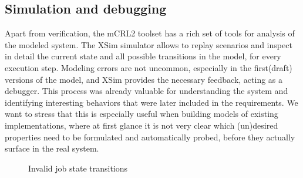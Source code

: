 \documentclass[sort&compress,preprint,3p]{elsarticle}
\begin{document}
\subsection{Simulation and debugging}
Apart from verification, the mCRL2 toolset has a rich set of tools for analysis of the modeled system. 
The XSim simulator allows to replay scenarios and inspect in 
detail the current state and all possible transitions in the model, for every execution step. 
Modeling errors are not uncommon, especially in the first(draft) versions of the
model, and XSim provides the necessary feedback, acting as a debugger.
This process was already valuable for understanding the
system and identifying interesting behaviors that were later included
in the requirements. We want to stress that this is especially useful
when building models of existing implementations, where at first glance it 
is not very clear which (un)desired properties need to be formulated and automatically probed,
before they actually surface in the real system.
\begin{figure}[bp!]
  \centering
  \hfill
  \caption{Invalid job state transitions}
  \label{fig:Simulator-job-trace}
\vspace{-8 pt}
\end{figure}
\end{document}
